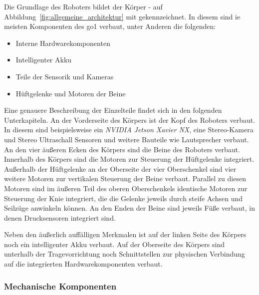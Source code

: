 Die Grundlage des Roboters bildet der Körper - auf Abbildung~\ref{fig:allgemeine_architektur} mit  gekennzeichnet.
In diesem sind ie meisten Komponenten des \gls{go1} verbaut, unter Anderen die folgenden:
\begin{itemize}
    \item Interne Hardwarekomponenten
    \item Intelligenter Akku
    \item Teile der Sensorik und Kameras
    \item Hüftgelenke und Motoren der Beine
\end{itemize}
Eine genauere Beschreibung der Einzelteile findet sich in den folgenden Unterkapiteln.
An der Vorderseite des Körpers ist der Kopf  des Roboters verbaut.
In diesem sind beispielsweise ein \emph{NVIDIA Jetson Xavier NX}, eine Stereo-Kamera und Stereo Ultraschall Sensoren
und weitere Bauteile wie Lautsprecher verbaut.
An den vier äußeren Ecken des Körpers sind die Beine des Roboters verbaut.
Innerhalb des Körpers sind die Motoren zur Steuerung der Hüftgelenke  integriert.
Außerhalb der Hüftgelenke an der Oberseite der vier Oberschenkel  sind vier weitere Motoren
zur vertikalen Steuerung der Beine verbaut.
Parallel zu diesen Motoren sind im äußeren Teil des oberen Oberschenkels identische Motoren
zur Steuerung der Knie  integriert, die die Gelenke jeweils durch steife Achsen und Seilzüge
anwinkeln können.
An den Enden der Beine sind jeweils Füße  verbaut, in denen Drucksensoren integriert sind.

Neben den äußerlich auffälligen Merkmalen ist auf der linken Seite des Körpers noch ein intelligenter Akku
 verbaut.
Auf der Oberseite des Körpers sind unterhalb der Tragevorrichtung  noch Schnittstellen  zur physischen
Verbindung auf die integrierten Hardwarekomponenten verbaut.


\subsubsection{Mechanische Komponenten}

